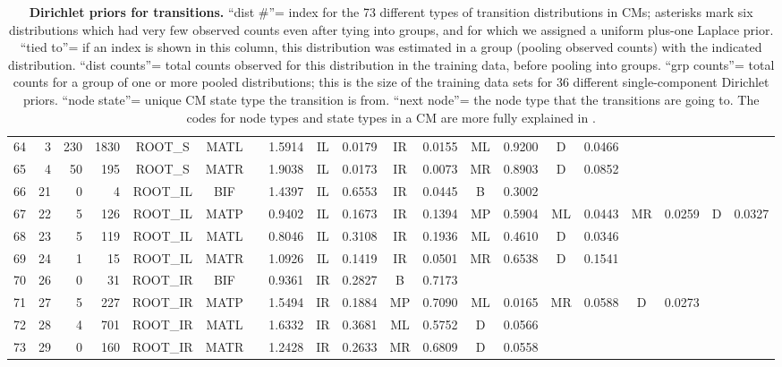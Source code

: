 \begin{table}
\begin{center}
\begin{tabular}{|rr|rr|cc|c|c|cc|cc|cc|cc|cc|cc|}
64  & 3  & 230   & 1830  & ROOT\_S  & MATL & & 1.5914  & IL & 0.0179 & IR & 0.0155 & ML & 0.9200 & D  & 0.0466 &    &  &  &  \\  
65  & 4  & 50    & 195   & ROOT\_S  & MATR & & 1.9038  & IL & 0.0173 & IR & 0.0073 & MR & 0.8903 & D  & 0.0852 &    &  &  &  \\  
66  & 21 & 0     & 4     & ROOT\_IL & BIF  & & 1.4397  & IL & 0.6553 & IR & 0.0445 & B  & 0.3002 &    &        &    &  &  &  \\  
67  & 22 & 5     & 126   & ROOT\_IL & MATP & & 0.9402  & IL & 0.1673 & IR & 0.1394 & MP & 0.5904 & ML & 0.0443 & MR & 0.0259 & D & 0.0327 \\  
68  & 23 & 5     & 119   & ROOT\_IL & MATL & & 0.8046  & IL & 0.3108 & IR & 0.1936 & ML & 0.4610 & D  & 0.0346 &    &  &  &  \\  
69  & 24 & 1     & 15    & ROOT\_IL & MATR & & 1.0926  & IL & 0.1419 & IR & 0.0501 & MR & 0.6538 & D  & 0.1541 &    &  &  &  \\  
70  & 26 & 0     & 31    & ROOT\_IR & BIF  & & 0.9361  & IR & 0.2827 & B  & 0.7173 &    &        &    &        &    &  &  &  \\  
71  & 27 & 5     & 227   & ROOT\_IR & MATP & & 1.5494  & IR & 0.1884 & MP & 0.7090 & ML & 0.0165 & MR & 0.0588 & D  & 0.0273 &  &  \\  
72  & 28 & 4     & 701   & ROOT\_IR & MATL & & 1.6332  & IR & 0.3681 & ML & 0.5752 & D  & 0.0566 &    &        &    &  &  &  \\  
73  & 29 & 0     & 160   & ROOT\_IR & MATR & & 1.2428  & IR & 0.2633 & MR & 0.6809 & D  & 0.0558 &    &        &    &  &  &  \\   \cline{1-6} \cline {8-20} 
\end{tabular}
\end{center}

\normalfont\rmfamily
\caption{\textbf{Dirichlet priors for transitions.}  ``dist \#''=
  index for the 73 different types of transition distributions in CMs;
  asterisks mark six distributions which had very few observed counts
  even after tying into groups, and for which we assigned a uniform
  plus-one Laplace prior. ``tied to''= if an index is shown in this
  column, this distribution was estimated in a group (pooling observed
  counts) with the indicated distribution.  ``dist counts''= total
  counts observed for this distribution in the training data, before
  pooling into groups. ``grp counts''= total counts for a group of one
  or more pooled distributions; this is the size of the training data
  sets for 36 different single-component Dirichlet priors.  ``node
  state''= unique CM state type the transition is from. 
  ``next node''= the node type that the transitions are going to.
  The codes for node types and state types in a CM are more fully
  explained in \cite{Eddy02b}.
}
\label{tbl:transitions}
\end{table}
\renewcommand{\baselinestretch}{1.5}
